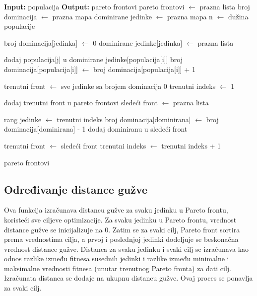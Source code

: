 \documentclass[12pt]{article}
\begin{document}
\begin{algorithmic}[1]
\STATE \textbf{Input:} populacija
\STATE \textbf{Output:} pareto frontovi
\STATE pareto frontovi $\gets$ prazna lista
\STATE broj dominacija $\gets$ prazna mapa
\STATE dominirane jedinke $\gets$ prazna mapa
\STATE n $\gets$ dužina populacije

    \STATE broj dominacija[jedinka] $\gets$ 0
    \STATE dominirane jedinke[jedinka] $\gets$ prazna lista
\ENDFOR

                \STATE dodaj populacija[j] u dominirane jedinke[populacija[i]]
                \STATE broj dominacija[populacija[i]] $\gets$ broj dominacija[populacija[i]] + 1
            \ENDIF
        \ENDIF
    \ENDFOR
\ENDFOR

\STATE trenutni front $\gets$ sve jedinke sa brojem dominacija 0
\STATE trenutni indeks $\gets$ 1

    \STATE dodaj trenutni front u pareto frontovi
    \STATE sledeći front $\gets$ prazna lista

        \STATE rang jedinke $\gets$ trenutni indeks
            \STATE broj dominacija[dominirana] $\gets$ broj dominacija[dominirana] - 1
                \STATE dodaj dominiranu u sledeći front
            \ENDIF
        \ENDFOR
    \ENDFOR

    \STATE trenutni front $\gets$ sledeći front
    \STATE trenutni indeks $\gets$ trenutni indeks + 1
\ENDWHILE

\RETURN pareto frontovi
\end{algorithmic}


\subsection{Određivanje distance gužve}
Ova funkcija izračunava distancu gužve za svaku jedinku u Pareto frontu, koristeći sve ciljeve optimizacije. Za svaku jedinku u Pareto frontu, vrednost distance gužve se inicijalizuje na 0. Zatim se za svaki cilj, Pareto front sortira prema vrednostima cilja, a prvoj i poslednjoj jedinki dodeljuje se beskonačna vrednost distance gužve. Distanca za svaku jedinku i svaki cilj se izračunava kao odnos razlike između fitnesa susednih jedinki i razlike između minimalne i maksimalne vrednosti fitnesa (unutar trenutnog Pareto fronta) za dati cilj. Izračunata distanca se dodaje na ukupnu distancu gužve. Ovaj proces se ponavlja za svaki cilj.
\end{document}
